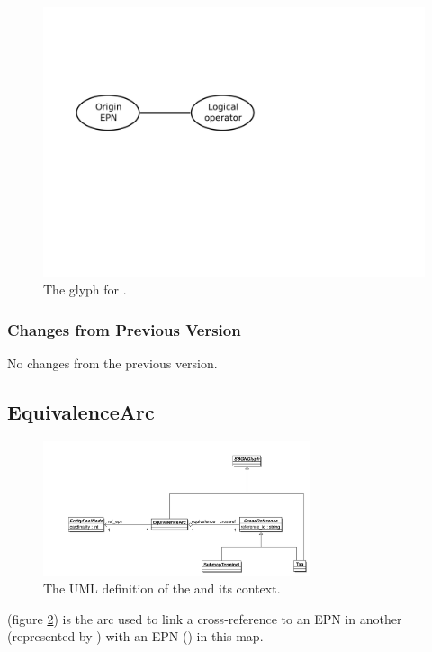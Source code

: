 \begin{figure}[H]
  \centering
  \includegraphics[scale = 0.4]{images/logicArc}
  \caption{The \PD glyph for .}
  \label{fig:logicArc}
\end{figure}

\subsubsection{Changes from Previous Version}

No changes from the previous version.

\subsection{EquivalenceArc}
\label{defn:EquivalenceArc}

\begin{figure}[htb]
  \centering
  \includegraphics[width = 0.7\textwidth]{images/equivalencearcuml}
  \caption{The UML definition of the  and its context.}
  \label{fig:equivalencearcuml}
\end{figure}


 (figure \ref{fig:equivalencearcuml}) is the arc used to link a cross-reference
to an EPN in another \PDm (represented by )
with an EPN () in this map.

